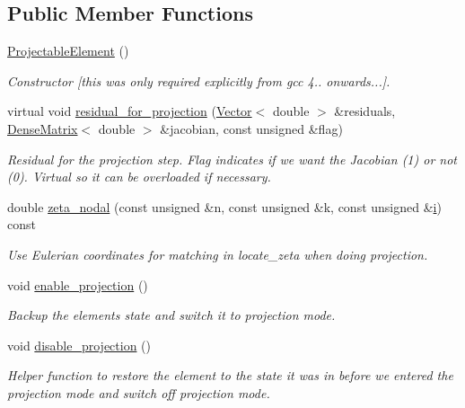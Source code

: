 \subsection*{Public Member Functions}
\begin{DoxyCompactItemize}
\item 
\hyperlink{classoomph_1_1ProjectableElement_a1892a2e757d35952be803d56078a3320}{Projectable\+Element} ()
\begin{DoxyCompactList}\small\item\em Constructor \mbox{[}this was only required explicitly from gcc 4.. onwards...\mbox{]}. \end{DoxyCompactList}\item 
virtual void \hyperlink{classoomph_1_1ProjectableElement_a1ff7a9207ec5e4fc2508e75064e136de}{residual\+\_\+for\+\_\+projection} (\hyperlink{classoomph_1_1Vector}{Vector}$<$ double $>$ \&residuals, \hyperlink{classoomph_1_1DenseMatrix}{Dense\+Matrix}$<$ double $>$ \&jacobian, const unsigned \&flag)
\begin{DoxyCompactList}\small\item\em Residual for the projection step. Flag indicates if we want the Jacobian (1) or not (0). Virtual so it can be overloaded if necessary. \end{DoxyCompactList}\item 
double \hyperlink{classoomph_1_1ProjectableElement_aefceb50221fe76ac929d618495530adf}{zeta\+\_\+nodal} (const unsigned \&n, const unsigned \&k, const unsigned \&\hyperlink{cfortran_8h_adb50e893b86b3e55e751a42eab3cba82}{i}) const
\begin{DoxyCompactList}\small\item\em Use Eulerian coordinates for matching in locate\+\_\+zeta when doing projection. \end{DoxyCompactList}\item 
void \hyperlink{classoomph_1_1ProjectableElement_a08968691986cf6dbe45e5c20d46e46be}{enable\+\_\+projection} ()
\begin{DoxyCompactList}\small\item\em Backup the element\textquotesingle{}s state and switch it to projection mode. \end{DoxyCompactList}\item 
void \hyperlink{classoomph_1_1ProjectableElement_afd30334bf9f7cf2e9d210b7705bd8572}{disable\+\_\+projection} ()
\begin{DoxyCompactList}\small\item\em Helper function to restore the element to the state it was in before we entered the projection mode and switch off projection mode. \end{DoxyCompactList}\item 

\end{DoxyCompactItemize}
